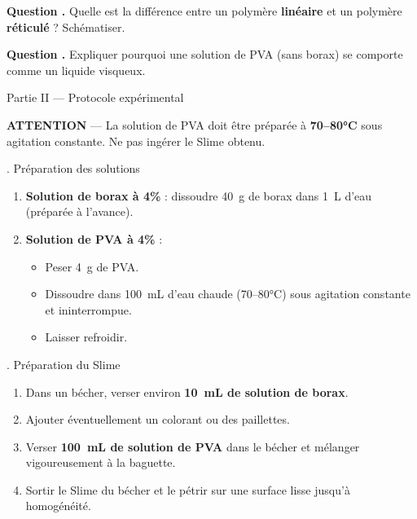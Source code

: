 \documentclass[11pt,a4paper]{article}
\newcommand{\sectitle}[1]{%
  \vspace{6pt}
  \noindent\colorbox{exoheader}{\parbox{\dimexpr\linewidth-2\fboxsep}%
    {\color{white}\bfseries\large\strut\quad #1}}
  \vspace{4pt}
}
\newcommand{\subsectitle}[1]{%
  \vspace{4pt}
  \noindent\colorbox{exolight}{\parbox{\dimexpr\linewidth-2\fboxsep}%
    {\color{exoheader}\bfseries\strut\quad #1}}
  \vspace{2pt}
}
\newcounter{question}
\newcommand{\question}{%
  \stepcounter{question}%
  \noindent\textcolor{exoheader}{\textbf{Question \thequestion.}}\quad
}
\begin{document}
\vspace{0.3cm}\noindent\dotfill

\question Quelle est la différence entre un polymère \textbf{linéaire} et un polymère \textbf{réticulé} ?
Schématiser. \dotfill

\vspace{2cm}

\question Expliquer pourquoi une solution de PVA (sans borax) se comporte comme un liquide visqueux. \dotfill

\vspace{0.3cm}\noindent\dotfill

\sectitle{Partie II --- Protocole expérimental}

\begin{mdframed}[backgroundcolor=orange!15, linecolor=warnorange, linewidth=2pt]
\textbf{\textcolor{warnorange}{\faExclamationTriangle\quad ATTENTION}} ---
La solution de PVA doit être préparée à \textbf{70--80°C} sous agitation constante.
Ne pas ingérer le Slime obtenu.
\end{mdframed}

\vspace{4pt}
\subsectitle{1. Préparation des solutions}

\begin{enumerate}[leftmargin=1.5cm, label=\textcolor{exoheader}{\textbf{\arabic*.}}]
  \item \textbf{Solution de borax à 4\%} : dissoudre 40~g de borax dans 1~L d'eau (préparée à l'avance).
  \item \textbf{Solution de PVA à 4\%} :
    \begin{itemize}
      \item Peser 4~g de PVA.
      \item Dissoudre dans 100~mL d'eau chaude (70--80°C) sous agitation constante et ininterrompue.
      \item Laisser refroidir.
    \end{itemize}
\end{enumerate}

\vspace{4pt}
\subsectitle{2. Préparation du Slime}

\begin{enumerate}[leftmargin=1.5cm, label=\textcolor{exoheader}{\textbf{\arabic*.}}]
  \item Dans un bécher, verser environ \textbf{10~mL de solution de borax}.
  \item Ajouter éventuellement un colorant ou des paillettes.
  \item Verser \textbf{100~mL de solution de PVA} dans le bécher et mélanger vigoureusement à la baguette.
  \item Sortir le Slime du bécher et le pétrir sur une surface lisse jusqu'à homogénéité.
\end{enumerate}
\end{document}
